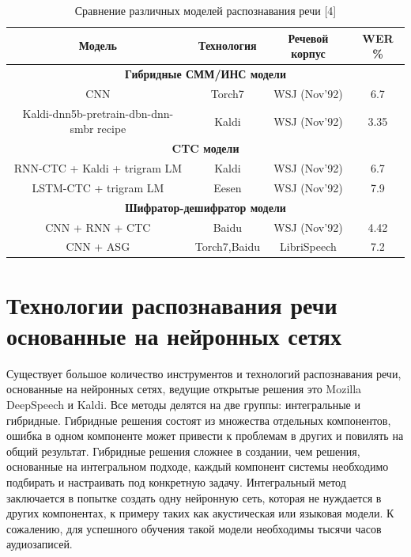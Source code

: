\documentclass[conference]{IEEEtran}
\begin{document}
    \begin{table}[htp]
        \caption{Сравнение различных моделей распознавания речи [4]}
        \begin{center}
            \begin{tabular}{|c|c|c|c|}
                \hline
                Модель & Технология & Речевой корпус & WER \% \\
                \hline
                \multicolumn{4}{|c|}{\textbf{Гибридные СММ/ИНС модели}} \\
                \hline
                CNN & Torch7 & WSJ (Nov’92) & 6.7 \\
                \hline
                Kaldi-dnn5b-pretrain-dbn-dnn-smbr recipe & Kaldi & WSJ (Nov’92) & 3.35 \\
                \hline
                \multicolumn{4}{|c|}{\textbf{CTC модели}} \\
                \hline
                RNN-CTC + Kaldi + trigram LM & Kaldi & WSJ (Nov’92) & 6.7 \\
                \hline
                LSTM-CTC + trigram LM & Eesen & WSJ (Nov’92) & 7.9 \\
                \hline
                \multicolumn{4}{|c|}{\textbf{Шифратор-дешифратор модели}} \\
                \hline
                CNN + RNN + CTC & Baidu & WSJ (Nov’92) & 4.42 \\
                \hline
                CNN + ASG & Torch7,Baidu & LibriSpeech & 7.2 \\
                \hline
            \end{tabular}
            \label{tab1}
        \end{center}
    \end{table}


    \section{Технологии распознавания речи основанные на нейронных сетях}
    Существует большое количество инструментов и технологий распознавания речи, основанные на нейронных сетях, ведущие открытые решения это Mozilla DeepSpeech и Kaldi.
    Все методы делятся на две группы: интегральные и гибридные.
    Гибридные решения состоят из множества отдельных компонентов, ошибка в одном компоненте может привести к проблемам в других и повилять на общий результат.
    Гибридные решения сложнее в создании, чем решения, основанные на интегральном подходе, каждый компонент системы необходимо подбирать и настраивать под конкретную задачу.
    Интегральный метод заключается в попытке создать одну нейронную сеть, которая не нуждается в других компонентах, к примеру таких как акустическая или языковая модели.
    К сожалению, для успешного обучения такой модели необходимы тысячи часов аудиозаписей.
\end{document}
